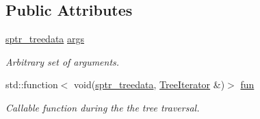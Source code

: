 \subsection*{Public Attributes}
\begin{DoxyCompactItemize}
\item 
\hyperlink{namespacepruner_a533476fef17527e75c4fba71d8c4ce50}{sptr\+\_\+treedata} \hyperlink{classpruner_1_1Tree_ac61a4133ceae4ea3473ea84df94f0931}{args}\hypertarget{classpruner_1_1Tree_ac61a4133ceae4ea3473ea84df94f0931}{}\label{classpruner_1_1Tree_ac61a4133ceae4ea3473ea84df94f0931}

\begin{DoxyCompactList}\small\item\em Arbitrary set of arguments. \end{DoxyCompactList}\item 
std\+::function$<$ void(\hyperlink{namespacepruner_a533476fef17527e75c4fba71d8c4ce50}{sptr\+\_\+treedata}, \hyperlink{classpruner_1_1TreeIterator}{Tree\+Iterator} \&)$>$ \hyperlink{classpruner_1_1Tree_a095f59358c914fb66939d2d82ca3ebc4}{fun}
\begin{DoxyCompactList}\small\item\em Callable function during the the tree traversal. \end{DoxyCompactList}\end{DoxyCompactItemize}
